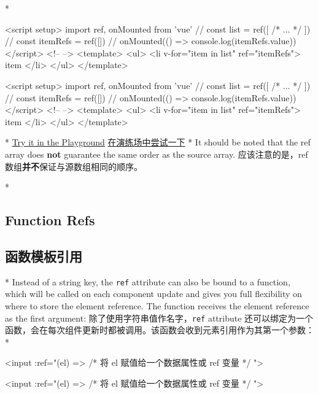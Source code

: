 \begin{paracol}{2}
\switchcolumn[0]*%
\begin{codeHtml}
<script setup>
import { ref, onMounted } from 'vue'
//
const list = ref([
  /* ... */
])
//
const itemRefs = ref([])
//
onMounted(() => console.log(itemRefs.value))
</script>
<!-- -->
<template>
  <ul>
    <li v-for="item in list" ref="itemRefs">
      {{ item }}
    </li>
  </ul>
</template>
\end{codeHtml}
\switchcolumn
\begin{codeHtml}
<script setup>
import { ref, onMounted } from 'vue'
//
const list = ref([
  /* ... */
])
//
const itemRefs = ref([])
//
onMounted(() => console.log(itemRefs.value))
</script>
<!-- -->
<template>
  <ul>
    <li v-for="item in list" ref="itemRefs">
      {{ item }}
    </li>
  </ul>
</template>
\end{codeHtml}
\switchcolumn[0]*%
\href{https://play.vuejs.org/\#eNpFjs1qwzAQhF9l0CU2uDZtb8UOlJ576bXqwaQyCGRJyCsTEHr3rGwnOehnd2e+nSQ+vW/XqMSH6JdL0J6wKIr+LK2evQuEhKCmBs5+u2hJ/SNjCm7GiV0naaW9OLsQjOZrKNrq97XBW4P3v/o51qTmHzUtd8k+e0CrqsZwRpIWGI0KVN0N7TqaqNp59JUuEt2SutKXY5elmimZT9/t2Tk1F+z0ZiTFFdBHs738Mxrry+TCIEWhQ9sttRQl0tEsK6U4HEBKW3LkfDA6o3dst3H77rFM5BtTfm/P}{Try
it in the Playground}
\switchcolumn
\href{https://play.vuejs.org/\#eNpFjs1qwzAQhF9l0CU2uDZtb8UOlJ576bXqwaQyCGRJyCsTEHr3rGwnOehnd2e+nSQ+vW/XqMSH6JdL0J6wKIr+LK2evQuEhKCmBs5+u2hJ/SNjCm7GiV0naaW9OLsQjOZrKNrq97XBW4P3v/o51qTmHzUtd8k+e0CrqsZwRpIWGI0KVN0N7TqaqNp59JUuEt2SutKXY5elmimZT9/t2Tk1F+z0ZiTFFdBHs738Mxrry+TCIEWhQ9sttRQl0tEsK6U4HEBKW3LkfDA6o3dst3H77rFM5BtTfm/P}{在演练场中尝试一下}
\switchcolumn[0]*%
It should be noted that the ref array does \textbf{not} guarantee the
same order as the source array.
\switchcolumn
应该注意的是，ref 数组\textbf{并不}保证与源数组相同的顺序。


\switchcolumn[0]*%
\subsection{Function Refs}
\switchcolumn
\subsection{函数模板引用}
\switchcolumn[0]*%
Instead of a string key, the \texttt{ref} attribute can also be bound to
a function, which will be called on each component update and gives you
full flexibility on where to store the element reference. The function
receives the element reference as the first argument:
\switchcolumn
除了使用字符串值作名字，\texttt{ref} attribute
还可以绑定为一个函数，会在每次组件更新时都被调用。该函数会收到元素引用作为其第一个参数：
\switchcolumn[0]*%
\begin{codeHtml}
<input :ref="(el) => { /* 将 el 赋值给一个数据属性或 ref 变量 */ }">
\end{codeHtml}
\switchcolumn
\begin{codeHtml}
<input :ref="(el) => { /* 将 el 赋值给一个数据属性或 ref 变量 */ }">
\end{codeHtml}



\end{paracol}

